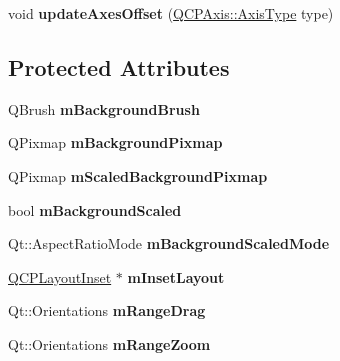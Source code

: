 \begin{DoxyCompactItemize}
\item 
void {\bfseries update\+Axes\+Offset} (\hyperlink{classQCPAxis_ae2bcc1728b382f10f064612b368bc18a}{Q\+C\+P\+Axis\+::\+Axis\+Type} type)\hypertarget{classQCPAxisRect_a6024ccdc74f5dc0e8a0fe482e5b28a20}{}\label{classQCPAxisRect_a6024ccdc74f5dc0e8a0fe482e5b28a20}

\end{DoxyCompactItemize}
\subsection*{Protected Attributes}
\begin{DoxyCompactItemize}
\item 
Q\+Brush {\bfseries m\+Background\+Brush}\hypertarget{classQCPAxisRect_a5748e1a37f63c428e38b0a7724b46259}{}\label{classQCPAxisRect_a5748e1a37f63c428e38b0a7724b46259}

\item 
Q\+Pixmap {\bfseries m\+Background\+Pixmap}\hypertarget{classQCPAxisRect_a38fb1a15f43228a0c124553649303722}{}\label{classQCPAxisRect_a38fb1a15f43228a0c124553649303722}

\item 
Q\+Pixmap {\bfseries m\+Scaled\+Background\+Pixmap}\hypertarget{classQCPAxisRect_aa74b9415598d59b49290e41e42d7ee27}{}\label{classQCPAxisRect_aa74b9415598d59b49290e41e42d7ee27}

\item 
bool {\bfseries m\+Background\+Scaled}\hypertarget{classQCPAxisRect_a5ad835f0fae5d7cc5ada9e063641dbf1}{}\label{classQCPAxisRect_a5ad835f0fae5d7cc5ada9e063641dbf1}

\item 
Qt\+::\+Aspect\+Ratio\+Mode {\bfseries m\+Background\+Scaled\+Mode}\hypertarget{classQCPAxisRect_a859fd368e794663e346b4f53f35078e9}{}\label{classQCPAxisRect_a859fd368e794663e346b4f53f35078e9}

\item 
\hyperlink{classQCPLayoutInset}{Q\+C\+P\+Layout\+Inset} $\ast$ {\bfseries m\+Inset\+Layout}\hypertarget{classQCPAxisRect_a255240399e0fd24baad80cbbe46f698a}{}\label{classQCPAxisRect_a255240399e0fd24baad80cbbe46f698a}

\item 
Qt\+::\+Orientations {\bfseries m\+Range\+Drag}\hypertarget{classQCPAxisRect_aa9f107f66ca3469ad50ee6cea7c9e237}{}\label{classQCPAxisRect_aa9f107f66ca3469ad50ee6cea7c9e237}

\item 
Qt\+::\+Orientations {\bfseries m\+Range\+Zoom}\hypertarget{classQCPAxisRect_a215eff671d48df2edccc36e7f976f28c}{}\label{classQCPAxisRect_a215eff671d48df2edccc36e7f976f28c}


\end{DoxyCompactItemize}
